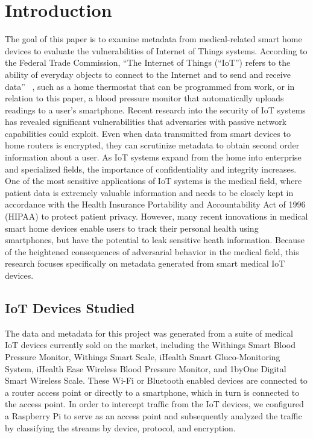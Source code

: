 \section{Introduction}

The goal of this paper is to examine metadata from medical-related smart home devices to evaluate the vulnerabilities of Internet of Things systems. According to the Federal Trade Commission, ``The Internet of Things (``IoT'') refers to the ability of everyday objects to connect to the Internet and to send and receive data'' ~\cite{ftc}, such as a home thermostat that can be programmed from work, or in relation to this paper, a blood pressure monitor that automatically uploads readings to a user's smartphone. Recent research into the security of IoT systems has revealed significant vulnerabilities that adversaries with passive network capabilities could exploit. Even when data transmitted from smart devices to home routers is encrypted, they can scrutinize metadata to obtain second order information about a user. As IoT systems expand from the home into enterprise and specialized fields, the importance of confidentiality and integrity increases. One of the most sensitive applications of IoT systems is the medical field, where patient data is extremely valuable information and needs to be closely kept in accordance with the Health Insurance Portability and Accountability Act of 1996 (HIPAA) to protect patient privacy. However, many recent innovations in medical smart home devices enable users to track their personal health using smartphones, but have the potential to leak sensitive heath information. Because of the heightened consequences of adversarial behavior in the medical field, this research focuses specifically on metadata generated from smart medical IoT devices.

\subsection{IoT Devices Studied}
The data and metadata for this project was generated from a suite of medical IoT devices currently sold on the market, including the Withings Smart Blood Pressure Monitor, Withings Smart Scale, iHealth Smart Gluco-Monitoring System, iHealth Ease Wireless Blood Pressure Monitor, and 1byOne Digital Smart Wireless Scale. These Wi-Fi or Bluetooth enabled devices are connected to a router access point or directly to a smartphone, which in turn is connected to the access point. In order to intercept traffic from the IoT devices, we configured a Raspberry Pi to serve as an access point and subsequently analyzed the traffic by classifying the streams by device, protocol, and encryption. 

